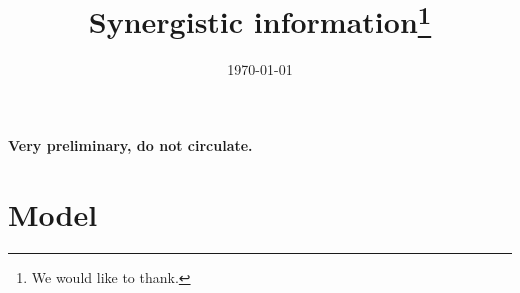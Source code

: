 \documentclass[a4paper]{article}
\begin{document}
\title{Synergistic information\thanks{We would like to thank.}}

\date{\today}


\maketitle

\begin{abstract}

\noindent 

\end{abstract}
 
\textbf{Very preliminary, do not circulate.}

\baselineskip0.7cm


\section{Model}
\end{document}
